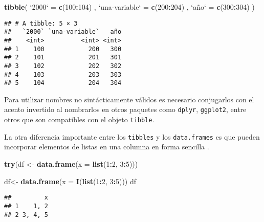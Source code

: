 \documentclass[]{article}
\newenvironment{Shaded}{\begin{snugshade}}{\end{snugshade}}
\newcommand{\KeywordTok}[1]{\textcolor[rgb]{0.13,0.29,0.53}{\textbf{#1}}}
\newcommand{\DataTypeTok}[1]{\textcolor[rgb]{0.13,0.29,0.53}{#1}}
\newcommand{\DecValTok}[1]{\textcolor[rgb]{0.00,0.00,0.81}{#1}}
\newcommand{\StringTok}[1]{\textcolor[rgb]{0.31,0.60,0.02}{#1}}
\newcommand{\OperatorTok}[1]{\textcolor[rgb]{0.81,0.36,0.00}{\textbf{#1}}}
\newcommand{\NormalTok}[1]{#1}
\begin{document}
\begin{Shaded}
\begin{Highlighting}[]
\KeywordTok{tibble}\NormalTok{(}
  \StringTok{`}\DataTypeTok{2000}\StringTok{`}\NormalTok{ =}\StringTok{ }\KeywordTok{c}\NormalTok{(}\DecValTok{100}\OperatorTok{:}\DecValTok{104}\NormalTok{)}
\NormalTok{  , }\StringTok{`}\DataTypeTok{una-variable}\StringTok{`}\NormalTok{ =}\StringTok{ }\KeywordTok{c}\NormalTok{(}\DecValTok{200}\OperatorTok{:}\DecValTok{204}\NormalTok{)}
\NormalTok{  , }\StringTok{`}\DataTypeTok{año}\StringTok{`}\NormalTok{ =}\StringTok{ }\KeywordTok{c}\NormalTok{(}\DecValTok{300}\OperatorTok{:}\DecValTok{304}\NormalTok{)}
\NormalTok{)}
\end{Highlighting}
\end{Shaded}

\begin{verbatim}
## # A tibble: 5 × 3
##   `2000` `una-variable`   año
##    <int>          <int> <int>
## 1    100            200   300
## 2    101            201   301
## 3    102            202   302
## 4    103            203   303
## 5    104            204   304
\end{verbatim}

Para utilizar nombres no sintácticamente válidos es necesario
conjugarlos con el acento invertido al nombrarlos en otros paquetes como
\texttt{dplyr}, \texttt{ggplot2}, entre otros que son compatibles con el
objeto \texttt{tibble}.

La otra diferencia importante entre los \texttt{tibbles} y los
\texttt{data.frames} es que pueden incorporar elementos de listas en una
columna en forma sencilla \parencite{wickhammx}.

\begin{Shaded}
\begin{Highlighting}[]
\KeywordTok{try}\NormalTok{(df <-}\StringTok{ }\KeywordTok{data.frame}\NormalTok{(}\DataTypeTok{x =} \KeywordTok{list}\NormalTok{(}\DecValTok{1}\OperatorTok{:}\DecValTok{2}\NormalTok{, }\DecValTok{3}\OperatorTok{:}\DecValTok{5}\NormalTok{)))}

\NormalTok{df<-}\StringTok{ }\KeywordTok{data.frame}\NormalTok{(}\DataTypeTok{x =} \KeywordTok{I}\NormalTok{(}\KeywordTok{list}\NormalTok{(}\DecValTok{1}\OperatorTok{:}\DecValTok{2}\NormalTok{, }\DecValTok{3}\OperatorTok{:}\DecValTok{5}\NormalTok{)))}
\NormalTok{df}
\end{Highlighting}
\end{Shaded}

\begin{verbatim}
##         x
## 1    1, 2
## 2 3, 4, 5
\end{verbatim}
\end{document}
